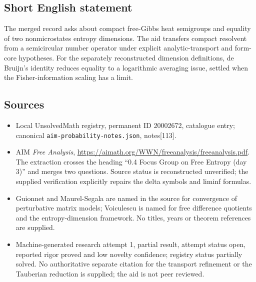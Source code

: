\documentclass[11pt]{article}
\begin{document}
\subsection{Short English statement}
The merged record asks about compact free-Gibbs heat semigroups and equality of two nonmicrostates entropy dimensions. The aid transfers compact resolvent from a semicircular number operator under explicit analytic-transport and form-core hypotheses. For the separately reconstructed dimension definitions, de Bruijn's identity reduces equality to a logarithmic averaging issue, settled when the Fisher-information scaling has a limit.
\subsection{Sources}
\begin{itemize}
\item Local UnsolvedMath registry, permanent ID 20002672, catalogue entry; canonical \texttt{aim-probability-notes.json}, notes[113].
\item AIM \emph{Free Analysis}, \url{https://aimath.org/WWN/freeanalysis/freeanalysis.pdf}. The extraction crosses the heading ``0.4 Focus Group on Free Entropy (day 3)'' and merges two questions. Source status is reconstructed unverified; the supplied verification explicitly repairs the delta symbols and liminf formulas.
\item Guionnet and Maurel-Segala are named in the source for convergence of perturbative matrix models; Voiculescu is named for free difference quotients and the entropy-dimension framework. No titles, years or theorem references are supplied.
\item Machine-generated research attempt 1, partial result, attempt status open, reported rigor proved and low novelty confidence; registry status partially solved. No authoritative separate citation for the transport refinement or the Tauberian reduction is supplied; the aid is not peer reviewed.
\end{itemize}
\end{document}
